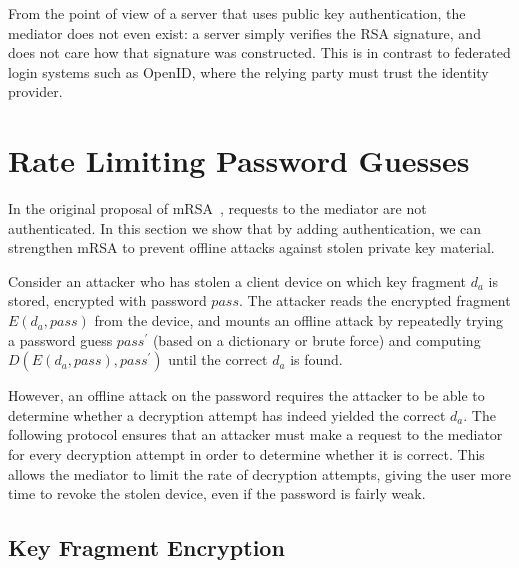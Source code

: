 \documentclass{llncs}
\begin{document}
From the point of view of a server that uses public key authentication, the mediator does not even
exist: a server simply verifies the RSA signature, and does not care how that signature was
constructed. This is in contrast to federated login systems such as OpenID, where the relying party
must trust the identity provider.

\section{Rate Limiting Password Guesses}\label{sec:ratelimit}

In the original proposal of mRSA~\cite{Boneh01}, requests to the mediator are not authenticated. In
this section we show that by adding authentication, we can strengthen mRSA to prevent offline
attacks against stolen private key material.

Consider an attacker who has stolen a client device on which key fragment $d_a$ is stored, encrypted
with password $\mathit{pass}$. The attacker reads the encrypted fragment $E(d_a, \mathit{pass})$
from the device, and mounts an offline attack by repeatedly trying a password guess
$\mathit{pass}^\prime$ (based on a dictionary or brute force) and computing
$D(E(d_a, \mathit{pass}), \mathit{pass}^\prime)$ until the correct $d_a$ is found.

However, an offline attack on the password requires the attacker to be able to determine whether a
decryption attempt has indeed yielded the correct $d_a$. The following protocol ensures that an
attacker must make a request to the mediator for every decryption attempt in order to determine
whether it is correct. This allows the mediator to limit the rate of decryption attempts, giving the
user more time to revoke the stolen device, even if the password is fairly weak.

\subsection{Key Fragment Encryption}\label{sec:fragment-encryption}
\end{document}
